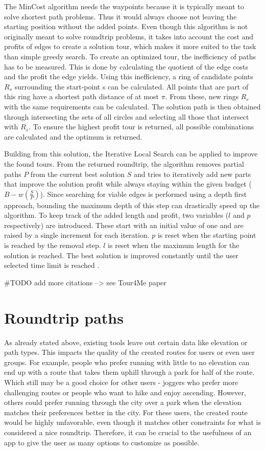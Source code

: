 The MinCost algorithm needs the waypoints because it is typically meant to solve shortest path problems. 
Thus it would always choose not leaving the starting position without the added points. 
Even though this algorithm is not originally meant to solve roundtrip problems, it takes into account the cost and profits of edges to create a solution tour, which makes it more suited to the task than simple greedy search.
To create an optimized tour, the inefficiency of paths has to be measured. 
This is done by calculating the quotient of the edge costs and the profit the edge yields. 
Using this inefficiency, a ring of candidate points $R_s$ surrounding the start-point s can be calculated.
All points that are part of this ring have a shortest path distance of at most $\pi$.
From these, new rings $R_r$ with the same requirements can be calculated. 
The solution path is then obtained through intersecting the sets of all circles and selecting all those that intersect with $R_s$.
To ensure the highest profit tour is returned, all possible combinations are calculated and the optimum is returned\cite{buchin_tour4me_2022}.

Building from this solution, the Iterative Local Search can be applied to improve the found tours.
From the returned roundtrip, the algorithm removes partial paths $P$ from the current best solution $S$ and tries to iteratively add new parts that improve the solution profit while always staying within the given budget ($B-w(\frac{S}{P})$).
Since searching for viable edges is performed using a depth first approach, bounding the maximum depth of this step can drastically speed up the algorithm.
To keep track of the added length and profit, two variables ($l$ and $p$ respectively) are introduced.
These start with an initial value of one and are raised by a single increment for each iteration.
$p$ is reset when the starting point is reached by the removal step.
$l$ is reset when the maximum length for the solution is reached.
The best solution is improved constantly until the user selected time limit is reached \cite{buchin_tour4me_2022}.

\#TODO add more citations --> see Tour4Me paper

\section{Roundtrip paths}
\label{sec:Roudtrip}
As already stated above, existing tools leave out certain data like elevation or path types.
This impacts the quality of the created routes for users or even user groups. 
For example, people who prefer running with little to no elevation can end up with a route that takes them uphill through a park for half of the route.
Which still may be a good choice for other users - joggers who prefer more challenging routes or people who want to hike and enjoy ascending.
However, others could prefer running through the city over a park when the elevation matches their preferences better in the city.
For these users, the created route would be highly unfavorable, even though it matches other constraints for what is considered a nice roundtrip.
Therefore, it can be crucial to the usefulness of an app to give the user as many options to customize as possible. 


